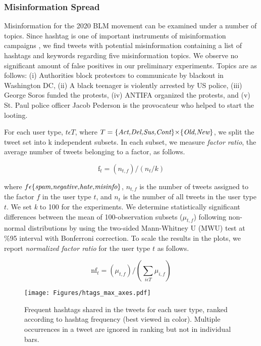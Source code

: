 \documentclass[sigconf]{acmart}
\begin{document}
\subsubsection{Misinformation Spread}
Misinformation for the 2020 BLM movement can be examined under a number of topics. Since hashtag is one of important instruments of misinformation campaigns \cite{Arif:2018}, we find tweets with potential misinformation containing a list of hashtags and keywords regarding five misinformation topics. We observe no significant amount of false positives in our preliminary experiments. Topics are as follows:  (i) Authorities block protestors to communicate by blackout in Washington DC, (ii) A black teenager is violently arrested by US police, (iii) George Soros funded the protests, (iv) ANTIFA organized the protests, and (v) St. Paul police officer Jacob Pederson is the provocateur who helped to start the looting.

For each user type, $t{\epsilon}T$, where $T=\{\emph{Act,Del,Sus,Cont}\}{\times}\{\emph{Old,New}\}$, we split the tweet set into k independent subsets. In each subset, we measure \emph{factor ratio}, the average number of tweets belonging to a factor, as follows.

\begin{equation}
\text{f}_t = (n_{t,f})/(n_t/k)
\end{equation}

\noindent where $f\epsilon\{\emph{spam,negative,hate,misinfo}\}$, $n_{t,f}$ is the number of tweets assigned to the factor $f$ in the user type $t$, and $n_t$ is the number of all tweets in the user type $t$. We set \emph{k} to 100 for the experiments. We determine statistically significant differences between the mean of 100-observation subsets ($\mu_{t,f}$) following non-normal distributions by using the two-sided Mann-Whitney U (MWU) test at \%95 interval with Bonferroni correction. To scale the results in the plots, we report \emph{normalized factor ratio} for the user type $t$ as follows.

\begin{equation}
 \text{nf}_t = (\mu_{t,f})/(\sum_{i\epsilon{T}}{\mu_{i,f}})
\end{equation}


\begin{figure*}[ht]
\centering
\texttt{[image: Figures/htags\_max\_axes.pdf]}
\caption{Frequent hashtags shared in the tweets for each user type, ranked according to hashtag frequency (best viewed in color). Multiple occurrences in a tweet are ignored in ranking but not in individual bars.} 
\label{fig:htags}
\end{figure*}
\end{document}

